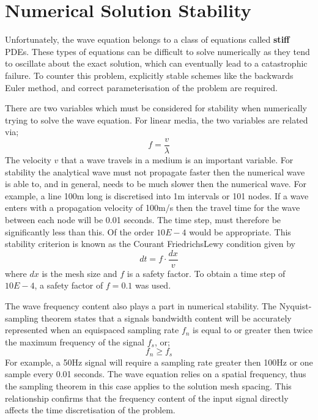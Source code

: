\section{Numerical Solution Stability} \label{sec:nsstab}
Unfortunately, the wave equation belongs to a class of equations called
\textbf{stiff} PDEs. These types of equations can be difficult to solve
numerically as they tend to oscillate about the exact solution, which can
eventually lead to a catastrophic failure. To counter this problem, explicitly
stable schemes like the backwards Euler method, and correct parameterisation of
the problem are required. 

There are two variables which must be considered for
stability when numerically trying to solve the wave equation. For linear media,
the two variables are related via;
\begin{equation} \label{eqn:freqvel}
f=\frac{v}{\lambda}
\end{equation}
The velocity $v$ that a wave travels in a medium is an important variable. For
stability the analytical wave must not propagate faster then the numerical wave
is able to, and in general, needs to be much slower then the numerical wave.
For example, a line 100m long is discretised into 1m intervals or 101 nodes. If
a wave enters with a propagation velocity of 100m/s then the travel time for
the wave between each node will be 0.01 seconds. The time step, must therefore
be significantly less than this. Of the order $10E-4$ would be appropriate. 
This stability criterion is known as the Courant\textendash
Friedrichs\textendash Lewy condition given by
\begin{equation}
dt=f\cdot \frac{dx}{v}
\end{equation}
where $dx$ is the mesh size and $f$ is a safety factor. To obtain a time step of
$10E-4$, a safety factor of $f=0.1$ was used.

The wave frequency content also plays a part in numerical stability. The
Nyquist-sampling theorem states that a signals bandwidth content will be
accurately represented when an equispaced sampling rate $f _{n}$ is
equal to or greater then twice the maximum frequency of the signal
$f_{s}$, or;
\begin{equation} \label{eqn:samptheorem}
 f_{n} \geqslant f_{s}
\end{equation}
For example, a 50Hz signal will require a sampling rate greater then 100Hz or
one sample every 0.01 seconds. The wave equation relies on a spatial frequency,
thus the sampling theorem in this case applies to the solution mesh spacing.
This relationship confirms that the frequency content of the input signal
directly affects the time discretisation of the problem.

